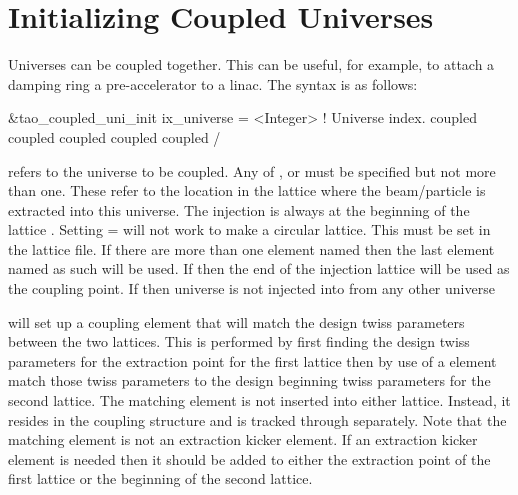 \section{Initializing Coupled Universes}
\label{s:coupled_uni}

Universes can be coupled together. This can be useful, for example, to attach a
damping ring a pre-accelerator to a linac. The syntax is as follows:
\begin{example}
  &tao_coupled_uni_init
    ix_universe                = <Integer>         ! Universe index.
    coupled%
    coupled%
    coupled%
    coupled%
    coupled%
  /
\end{example}
 refers to the universe to be coupled. Any of
,  or  must be specified but
not more than one. These refer to the location in the lattice where
the beam/particle is extracted into this universe.  The injection is
always at the beginning of the lattice . Setting
 =  will not work to make a circular
lattice. This must be set in the lattice file.  If there are more than
one element named  then the last element named as such
will be used. If  then the end of the injection
lattice will be used as the coupling point. If  then universe  is not injected into from any other universe

 will set up a coupling element that will match
the design twiss parameters between the two lattices. This is
performed by first finding the design twiss parameters for the
extraction point for the first lattice then by use of a \bmad
{} element match those twiss parameters to the design
beginning twiss parameters for the second lattice. The matching
element is not inserted into either lattice. Instead, it resides in
the \tao coupling structure and is tracked through separately. Note
that the matching element is not an extraction kicker element. If an
extraction kicker element is needed then it should be added to either
the extraction point of the first lattice or the beginning of the
second lattice.

